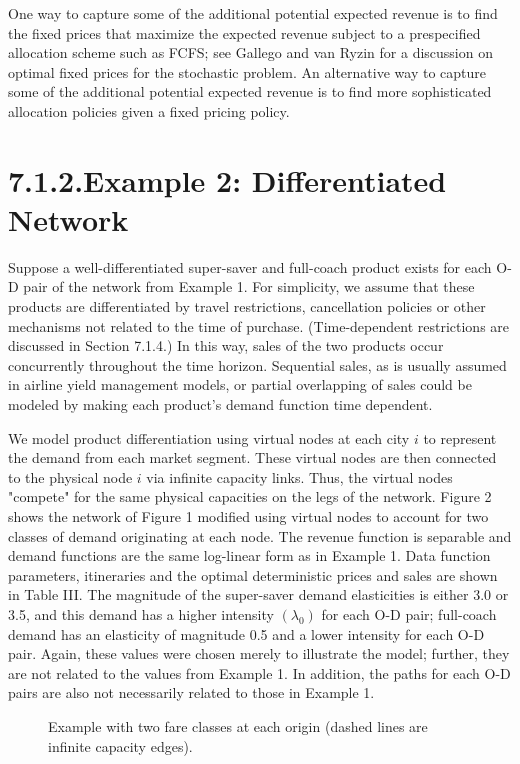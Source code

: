 One way to capture some of the additional potential expected revenue is to find the fixed prices that maximize the expected revenue subject to a prespecified allocation scheme such as FCFS; see Gallego and van Ryzin for a discussion on optimal fixed prices for the stochastic problem. An alternative way to capture some of the additional potential expected revenue is to find more sophisticated allocation policies given a fixed pricing policy.

\section{7.1.2.Example 2: Differentiated Network}\label{differentiated-network}

Suppose a well-differentiated super-saver and full-coach product exists for each O-D pair of the network from Example 1. For simplicity, we assume that these products are differentiated by travel restrictions, cancellation policies or other mechanisms not related to the time of purchase. (Time-dependent restrictions are discussed in Section 7.1.4.) In this way, sales of the two products occur concurrently throughout the time horizon. Sequential sales, as is usually assumed in airline yield management models, or partial overlapping of sales could be modeled by making each product's demand function time dependent.

We model product differentiation using virtual nodes at each city \(i\) to represent the demand from each market segment. These virtual nodes are then connected to the physical node \(i\) via infinite capacity links. Thus, the virtual nodes "compete" for the same physical capacities on the legs of the network. Figure 2 shows the network of Figure 1 modified using virtual nodes to account for two classes of demand originating at each node. The revenue function is separable and demand functions are the same log-linear form as in Example 1. Data function parameters, itineraries and the optimal deterministic prices and sales are shown in Table III. The magnitude of the super-saver demand elasticities is either 3.0 or 3.5, and this demand has a higher intensity \((\lambda_0)\) for each O-D pair; full-coach demand has an elasticity of magnitude 0.5 and a lower intensity for each O-D pair. Again, these values were chosen merely to illustrate the model; further, they are not related to the values from Example 1. In addition, the paths for each O-D pairs are also not necessarily related to those in Example 1.

\begin{figure}[h]
\centering
\caption{Example with two fare classes at each origin (dashed lines are infinite capacity edges).}
\label{fig:fare-classes}
\end{figure}

